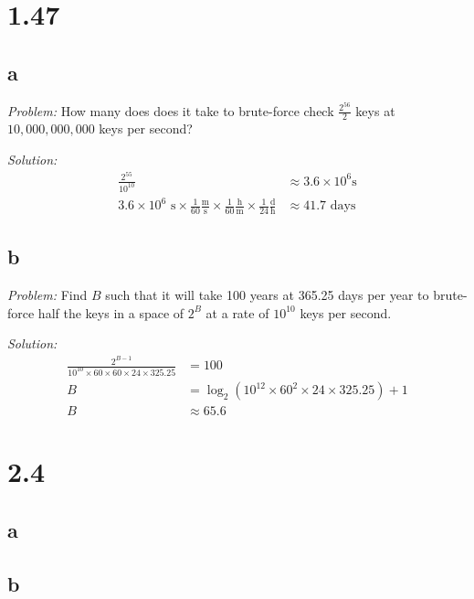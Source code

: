 \documentclass[12pt]{article}
\begin{document}
\section*{1.47}
\subsection*{a}
\textit{Problem:} How many does does it take to brute-force check $\frac{2^{56}}{2}$ keys at $10,000,000,000$ keys per second?

\textit{Solution:}
\begin{align*}
    \frac{2^{55}}{10^{10}} &\approx 3.6 \times 10^6 \text{s} \\
    3.6 \times 10^6 \text{ s} \times \frac{1}{60} \frac{\text{m}}{\text{s}} \times \frac{1}{60} \frac{\text{h}}{\text{m}} \times \frac{1}{24} \frac{\text{d}}{\text{h}} &\approx \boxed{41.7} \text{ days}
\end{align*}

\subsection*{b}
\textit{Problem:} Find $B$ such that it will take 100 years at 365.25 days per year to brute-force half the keys in a space of $2^B$ at a rate of $10^{10}$ keys per second.

\textit{Solution:}
\begin{align*}
    \frac{2^{B-1}}{10^{10} \times 60 \times 60 \times 24 \times 325.25} &= 100 \\
    B &= \log_2(10^{12} \times 60^2 \times 24 \times 325.25) + 1 \\
    B &\approx \boxed{65.6}
\end{align*}

\section*{2.4}
\subsection*{a}
\subsection*{b}
\end{document}
